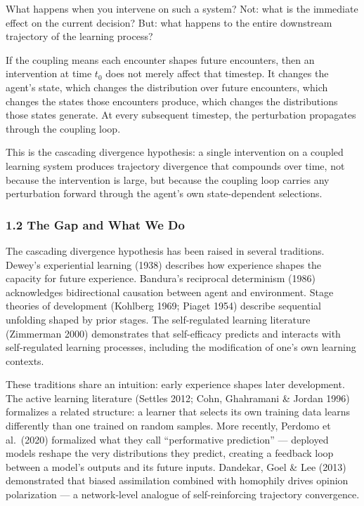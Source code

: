 \documentclass[
]{article}
\begin{document}
What happens when you intervene on such a system? Not: what is the
immediate effect on the current decision? But: what happens to the
entire downstream trajectory of the learning process?

If the coupling means each encounter shapes future encounters, then an
intervention at time \(t_0\) does not merely affect that timestep. It
changes the agent's state, which changes the distribution over future
encounters, which changes the states those encounters produce, which
changes the distributions those states generate. At every subsequent
timestep, the perturbation propagates through the coupling loop.

This is the cascading divergence hypothesis: a single intervention on a
coupled learning system produces trajectory divergence that compounds
over time, not because the intervention is large, but because the
coupling loop carries any perturbation forward through the agent's own
state-dependent selections.

\subsubsection{1.2 The Gap and What We Do}\label{the-gap-and-what-we-do}

The cascading divergence hypothesis has been raised in several
traditions. Dewey's experiential learning (1938) describes how
experience shapes the capacity for future experience. Bandura's
reciprocal determinism (1986) acknowledges bidirectional causation
between agent and environment. Stage theories of development (Kohlberg
1969; Piaget 1954) describe sequential unfolding shaped by prior stages.
The self-regulated learning literature (Zimmerman 2000) demonstrates
that self-efficacy predicts and interacts with self-regulated learning
processes, including the modification of one's own learning contexts.

These traditions share an intuition: early experience shapes later
development. The active learning literature (Settles 2012; Cohn,
Ghahramani \& Jordan 1996) formalizes a related structure: a learner
that selects its own training data learns differently than one trained
on random samples. More recently, Perdomo et al.~(2020) formalized what
they call ``performative prediction'' --- deployed models reshape the
very distributions they predict, creating a feedback loop between a
model's outputs and its future inputs. Dandekar, Goel \& Lee (2013)
demonstrated that biased assimilation combined with homophily drives
opinion polarization --- a network-level analogue of self-reinforcing
trajectory convergence.
\end{document}
